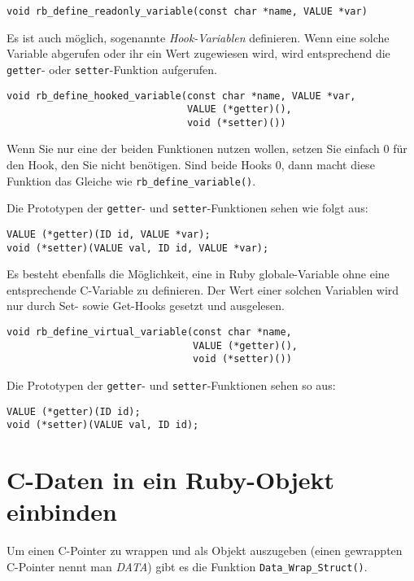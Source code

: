 \begin{lstlisting}
void rb_define_readonly_variable(const char *name, VALUE *var)
\end{lstlisting}

Es ist auch möglich, sogenannte \emph{Hook-Variablen} definieren. Wenn
eine solche Variable abgerufen oder ihr ein Wert zugewiesen wird, wird
entsprechend die \verb+getter+- oder \verb+setter+-Funktion
aufgerufen.

\begin{lstlisting}
void rb_define_hooked_variable(const char *name, VALUE *var,
                               VALUE (*getter)(),
                               void (*setter)())
\end{lstlisting}

\noindent Wenn Sie nur eine der beiden Funktionen nutzen wollen,
setzen Sie einfach 0 für den Hook, den Sie nicht benötigen. Sind beide
Hooks 0, dann macht diese Funktion das Gleiche wie
\verb+rb_define_variable()+.

Die Prototypen der \verb+getter+- und \verb+setter+-Funk\-tion\-en
sehen wie folgt aus:

\begin{lstlisting}
VALUE (*getter)(ID id, VALUE *var);
void (*setter)(VALUE val, ID id, VALUE *var);
\end{lstlisting}

Es besteht ebenfalls die Möglichkeit, eine in Ruby globale-Variable
ohne eine entsprechende C-Variable zu definieren. Der Wert einer
solchen Variablen wird nur durch Set- sowie Get-Hooks gesetzt und
ausgelesen.

\begin{lstlisting}
void rb_define_virtual_variable(const char *name,
                                VALUE (*getter)(),
                                void (*setter)())
\end{lstlisting}

Die Prototypen der \verb+getter+- und \verb+setter+-Funk\-tion\-en
sehen so aus:

\begin{lstlisting}
VALUE (*getter)(ID id);
void (*setter)(VALUE val, ID id);
\end{lstlisting}

\section{C-Daten in ein Ruby-Objekt einbinden}
\label{sec:c-in-ruby}

Um einen C-Pointer zu wrappen und als Objekt auszugeben (einen
gewrappten C-Pointer nennt man \emph{DATA}) gibt es die Funktion
\verb+Data_Wrap_Struct()+.

